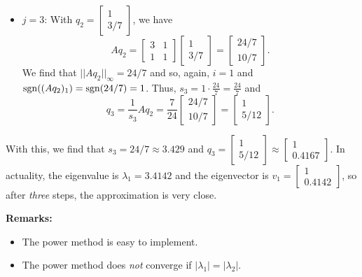 \documentclass[letterpaper]{article}
\newcommand{\0}{\mathbf{0}}
\begin{document}
\begin{mdframed}
\begin{itemize}
        \item $j = 3$: With $q_2 = \begin{bmatrix}
            1 \\ 3/7
        \end{bmatrix}$, we have 
        \[Aq_2 = \begin{bmatrix}
            3 & 1 \\ 1 & 1
        \end{bmatrix} \begin{bmatrix}
            1 \\ 3/7
        \end{bmatrix} = \begin{bmatrix}
            24 / 7 \\ 10 / 7
        \end{bmatrix}.\] We find that $||Aq_2||_\infty = 24 / 7$ and so, again, $i = 1$ and $\operatorname{sgn}((Aq_2)_1) = \operatorname{sgn}(24 / 7) = 1$. Thus, $s_3 = 1 \cdot \frac{24}{7} = \frac{24}{7}$ and 
        \[q_3 = \frac{1}{s_3}Aq_2 = \frac{7}{24}\begin{bmatrix}
            24 / 7 \\ 10 / 7
        \end{bmatrix} = \begin{bmatrix}
            1 \\ 5 / 12
        \end{bmatrix}.\]
    \end{itemize}
    With this, we find that $s_3 = 24 / 7 \approx 3.429$ and $q_3 = \begin{bmatrix}
        1 \\ 5/12
    \end{bmatrix} \approx \begin{bmatrix}
        1 \\ 0.4167
    \end{bmatrix}$. In actuality, the eigenvalue is $\lambda_1 = 3.4142$ and the eigenvector is $v_1 = \begin{bmatrix}
        1 \\ 0.4142
    \end{bmatrix}$, so after \emph{three} steps, the approximation is very close.
\end{mdframed}
\textbf{Remarks:}
\begin{itemize}
    \item The power method is easy to implement. 
    \item The power method does \emph{not} converge if $|\lambda_1| = |\lambda_2|$. 
\end{itemize}
\end{document}
